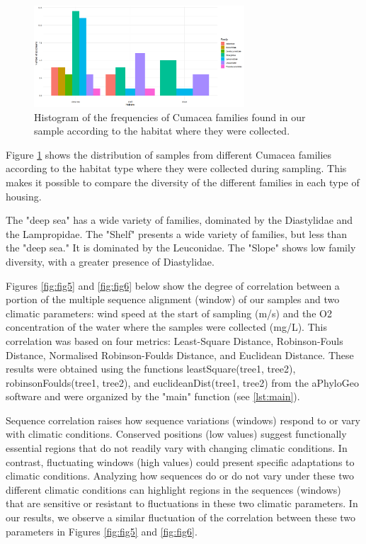 \begin{figure}[]
    \centering
    \includegraphics[width=0.7\textwidth]{figure4.png}
    \caption{Histogram of the frequencies of Cumacea families found in our sample according to the habitat where they were collected.\label{fig:fig4}}
\end{figure}

Figure \ref{fig:fig4} shows the distribution of samples from different Cumacea families according to the habitat type where they were collected during sampling. This makes it possible to compare the diversity of the different families in each type of housing.

The "deep sea" has a wide variety of families, dominated by the Diastylidae and the Lampropidae. The "Shelf" presents a wide variety of families, but less than the "deep sea." It is dominated by the Leuconidae. The "Slope" shows low family diversity, with a greater presence of Diastylidae. 

Figures \ref{fig:fig5} and \ref{fig:fig6} below show the degree of correlation between a portion of the multiple sequence alignment (window) of our samples and two climatic parameters: wind speed at the start of sampling (m/s) and the O2 concentration of the water where the samples were collected (mg/L). This correlation was based on four metrics: Least-Square Distance, Robinson-Fouls Distance, Normalised Robinson-Foulds Distance, and Euclidean Distance. These results were obtained using the functions leastSquare(tree1, tree2), robinsonFoulds(tree1, tree2), and euclideanDist(tree1, tree2) from the aPhyloGeo software and were organized by the "main" function (see \autoref{lst:main}). 

Sequence correlation raises how sequence variations (windows) respond to or vary with climatic conditions. Conserved positions (low values) suggest functionally essential regions that do not readily vary with changing climatic conditions. In contrast, fluctuating windows (high values) could present specific adaptations to climatic conditions. Analyzing how sequences do or do not vary under these two different climatic conditions can highlight regions in the sequences (windows) that are sensitive or resistant to fluctuations in these two climatic parameters. In our results, we observe a similar fluctuation of the correlation between these two parameters in Figures \ref{fig:fig5} and \ref{fig:fig6}.

